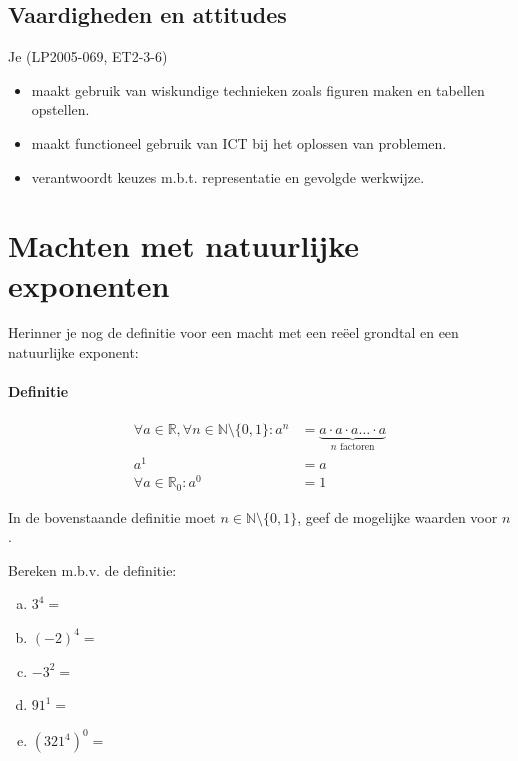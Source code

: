 \documentclass[12pt,twoside]{article}
\begin{document}
\subsection*{Vaardigheden en attitudes}
\vspace*{-0.8cm}
{\singlespacing
Je \hfill {\scriptsize(LP2005-069, ET2-3-6)}
\begin{itemize}
  \itemsep-0.2em
  \item maakt gebruik van wiskundige technieken zoals figuren maken en tabellen opstellen.
  \item maakt functioneel gebruik van ICT bij het oplossen van problemen.
  \item verantwoordt keuzes m.b.t. representatie en gevolgde werkwijze.
\end{itemize}
}
\vspace*{-1cm}

\thispagestyle{empty}
\mbox{}
\newpage
\clearpage
\thispagestyle{empty}
\mbox{}
\newpage
\clearpage
{} 

\fancyhead[RE,LO]{}


\section{Machten met natuurlijke exponenten}

Herinner je nog de definitie voor een macht met een reëel grondtal en een natuurlijke exponent:

\paragraph*{Definitie}

\begin{mdframed}
\begin{align*}
\forall a \in \mathbb{R}, \forall n\in \mathbb{N}\setminus\{0,1\} : a^n &= \underbrace{a\cdot a\cdot a \ldots \cdot a}_{\mbox{$n$ factoren}}\\
a^1 &= a\\
\forall a \in \mathbb{R}_0 : a^0 &= 1
\end{align*}
\end{mdframed}

\begin{oefening}
In de bovenstaande definitie moet $n\in \mathbb{N}\setminus\{0,1\}$, geef de mogelijke waarden voor $n$.
\end{oefening}

\begin{oefening}
Bereken m.b.v. de definitie:\\
\begin{enumerate}[(a)]
  \itemsep1em
  \item $3^4=$\arulefill
  \item $(-2)^4=$\arulefill
  \item $-3^2=$\arulefill
  \item $91^1=$\arulefill
  \item $\left(321^4\right)^0=$\arulefill
\end{enumerate}
\end{oefening}
\end{document}
